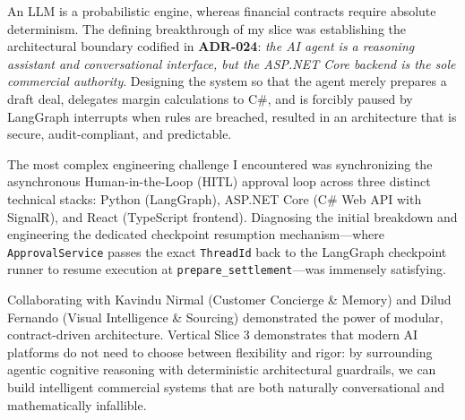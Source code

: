 An LLM is a probabilistic engine, whereas financial contracts require absolute determinism. The defining breakthrough of my slice was establishing the architectural boundary codified in \textbf{ADR-024}: \textit{the AI agent is a reasoning assistant and conversational interface, but the ASP.NET Core backend is the sole commercial authority}. Designing the system so that the agent merely prepares a draft deal, delegates margin calculations to C\#, and is forcibly paused by LangGraph interrupts when rules are breached, resulted in an architecture that is secure, audit-compliant, and predictable.

The most complex engineering challenge I encountered was synchronizing the asynchronous Human-in-the-Loop (HITL) approval loop across three distinct technical stacks: Python (LangGraph), ASP.NET Core (C\# Web API with SignalR), and React (TypeScript frontend). Diagnosing the initial breakdown and engineering the dedicated checkpoint resumption mechanism---where \texttt{ApprovalService} passes the exact \texttt{ThreadId} back to the LangGraph checkpoint runner to resume execution at \texttt{prepare\_settlement}---was immensely satisfying.

Collaborating with Kavindu Nirmal (Customer Concierge \& Memory) and Dilud Fernando (Visual Intelligence \& Sourcing) demonstrated the power of modular, contract-driven architecture. Vertical Slice 3 demonstrates that modern AI platforms do not need to choose between flexibility and rigor: by surrounding agentic cognitive reasoning with deterministic architectural guardrails, we can build intelligent commercial systems that are both naturally conversational and mathematically infallible.
